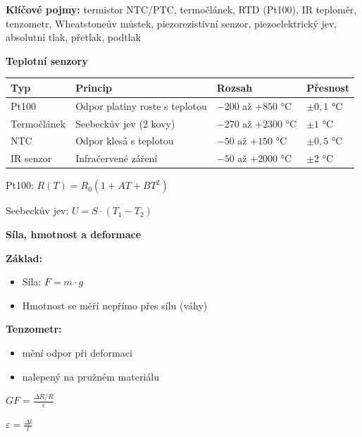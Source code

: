 \documentclass[a4paper,10pt]{article}
\begin{document}
\begin{pojmybox}
\textbf{Klíčové pojmy:}
termistor NTC/PTC, termočlánek, RTD (Pt100),
IR teploměr, tenzometr, Wheatstoneův můstek,
piezorezistivní senzor, piezoelektrický jev,
absolutní tlak, přetlak, podtlak
\end{pojmybox}

\begin{vysvetlenibox}

\textbf{Teplotní senzory}

\begin{center}
\begin{tabularx}{0.95\linewidth}{l X l l}
Typ & Princip & Rozsah & Přesnost \\
\hline
Pt100 & Odpor platiny roste s teplotou & $-200$ až $+850$ °C & $\pm0{,}1$ °C \\
Termočlánek & Seebeckův jev (2 kovy) & $-270$ až $+2300$ °C & $\pm1$ °C \\
NTC & Odpor klesá s teplotou & $-50$ až $+150$ °C & $\pm0{,}5$ °C \\
IR senzor & Infračervené záření & $-50$ až $+2000$ °C & $\pm2$ °C \\
\end{tabularx}
\end{center}

\begin{vzorcebox}
Pt100: $R(T) = R_0 (1 + AT + BT^2)$

Seebeckův jev: $U = S \cdot (T_1 - T_2)$
\end{vzorcebox}

\textbf{Síla, hmotnost a deformace}

\textbf{Základ:}
\begin{itemize}
\item Síla: $F = m \cdot g$
\item Hmotnost se měří nepřímo přes sílu (váhy)
\end{itemize}

\textbf{Tenzometr:}
\begin{itemize}
\item mění odpor při deformaci
\item nalepený na pružném materiálu
\end{itemize}

\begin{vzorcebox}
$GF = \frac{\Delta R / R}{\varepsilon}$

$\varepsilon = \frac{\Delta l}{l}$
\end{vzorcebox}


\end{vysvetlenibox}
\end{document}

